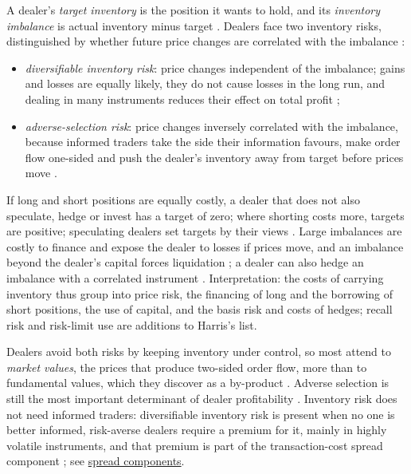\begin{qfdefinition}\label{def:dealer-inventory-risk}
 A dealer's \emph{target inventory} is the position it wants to hold, and its \emph{inventory imbalance} is actual inventory minus target \citep[chap.~``Dealers'', p.~283]{alpha-harris}. Dealers face two inventory risks, distinguished by whether future price changes are correlated with the imbalance \citep[same chap., p.~285]{alpha-harris}:
\begin{itemize}
\item \emph{diversifiable inventory risk}: price changes independent of the imbalance; gains and losses are equally likely, they do not cause losses in the long run, and dealing in many instruments reduces their effect on total profit \citep[same chap., pp.~285--286]{alpha-harris};
\item \emph{adverse-selection risk}: price changes inversely correlated with the imbalance, because informed traders take the side their information favours, make order flow one-sided and push the dealer's inventory away from target before prices move \citep[same chap., p.~286]{alpha-harris}.
\end{itemize}

 If long and short positions are equally costly, a dealer that does not also speculate, hedge or invest has a target of zero; where shorting costs more, targets are positive; speculating dealers set targets by their views \citep[same chap., pp.~283--284]{alpha-harris}. Large imbalances are costly to finance and expose the dealer to losses if prices move, and an imbalance beyond the dealer's capital forces liquidation \citep[same chap., p.~284]{alpha-harris}; a dealer can also hedge an imbalance with a correlated instrument \citep[same chap., p.~285, Table~13-2]{alpha-harris}. Interpretation: the costs of carrying inventory thus group into price risk, the financing of long and the borrowing of short positions, the use of capital, and the basis risk and costs of hedges; recall risk and risk-limit use are additions to Harris's list.

 Dealers avoid both risks by keeping inventory under control, so most attend to \emph{market values}, the prices that produce two-sided order flow, more than to fundamental values, which they discover as a by-product \citep[same chap., pp.~286--287]{alpha-harris}. Adverse selection is still the most important determinant of dealer profitability \citep[same chap., p.~286]{alpha-harris}. Inventory risk does not need informed traders: diversifiable inventory risk is present when no one is better informed, risk-averse dealers require a premium for it, mainly in highly volatile instruments, and that premium is part of the transaction-cost spread component \citep[chap.~``Bid/Ask Spreads'', pp.~299 and~313]{alpha-harris}; see \hyperref[res:adverse-selection-spread-component]{spread components}.


\end{qfdefinition}
